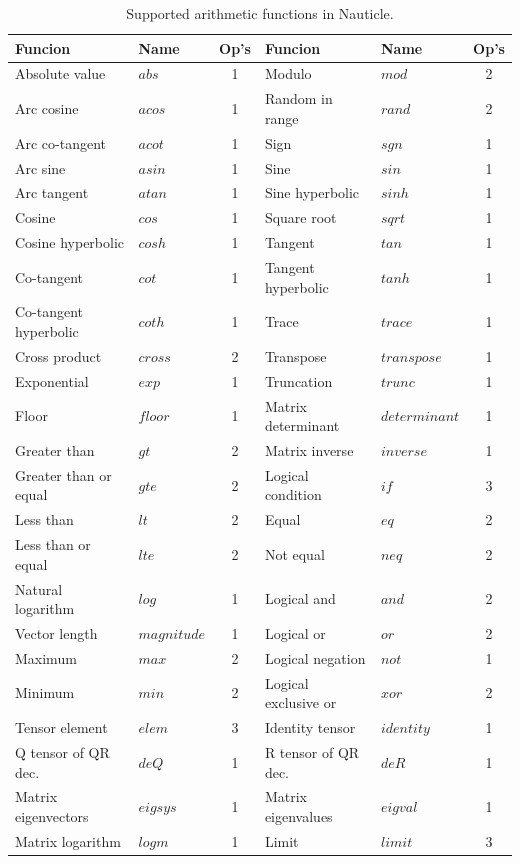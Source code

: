 \documentclass[a4paper,12pt,openany]{book}
\theoremstyle{break}
\begin{document}
\begin{table} [H]
\begin{center}
\caption{Supported arithmetic functions in Nauticle.}\label{tbl:arfc}
\begin{tabular}{ l l c | l l c }
\toprule[1.5pt]
\bf Funcion & \bf Name & \bf Op's & \bf Funcion & \bf Name & \bf Op's\\ 
\midrule
Absolute value & $abs$ & 1 & Modulo & $mod$ & 2 \\
Arc cosine & $acos$ & 1 & Random in range & $rand$ & 2 \\
Arc co-tangent & $acot$ & 1 & Sign & $sgn$ & 1 \\
Arc sine & $asin$ & 1 & Sine & $sin$ & 1 \\
Arc tangent & $atan$ & 1 & Sine hyperbolic & $sinh$ & 1 \\
Cosine & $cos$ & 1 & Square root & $sqrt$ & 1 \\
Cosine hyperbolic & $cosh$ & 1 & Tangent & $tan$ & 1 \\
Co-tangent & $cot$ & 1 & Tangent hyperbolic & $tanh$ & 1 \\
Co-tangent hyperbolic & $coth$ & 1 & Trace & $trace$ & 1 \\
Cross product & $cross$ & 2 & Transpose & $transpose$ & 1 \\
Exponential & $exp$ & 1 & Truncation & $trunc$ & 1 \\
Floor & $floor$ & 1 & Matrix determinant & $determinant$ & 1 \\
Greater than & $gt$ & 2 & Matrix inverse & $inverse$ & 1 \\
Greater than or equal & $gte$ & 2 & Logical condition & $if$ & 3 \\
Less than & $lt$ & 2 & Equal & $eq$ & 2 \\
Less than or equal & $lte$ & 2 & Not equal & $neq$ & 2 \\
Natural logarithm & $log$ & 1 & Logical and & $and$ & 2 \\
Vector length & $magnitude$ & 1 & Logical or & $or$ & 2 \\
Maximum & $max$ & 2 & Logical negation & $not$ & 1 \\
Minimum & $min$ & 2 & Logical exclusive or & $xor$ & 2 \\
Tensor element & $elem$ & 3 & Identity tensor & $identity$ & 1 \\
Q tensor of QR dec. & $deQ$ & 1 & R tensor of QR dec. & $deR$ & 1 \\ 
Matrix eigenvectors & $eigsys$ & 1 & Matrix eigenvalues & $eigval$ & 1 \\
Matrix logarithm & $logm$ & 1 & Limit & $limit$ & 3 \\
\bottomrule[1.25pt]
\end{tabular}
\end{center}
\end{table}
\end{document}
